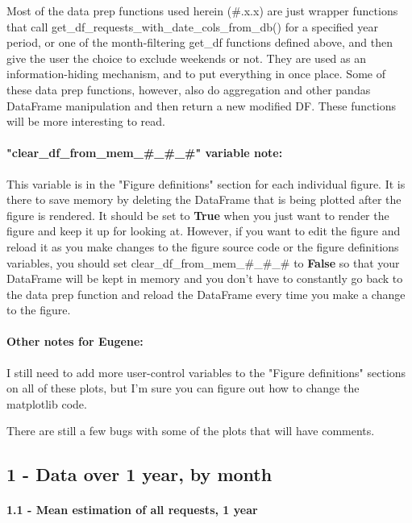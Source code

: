 \documentclass[11pt]{article}
\begin{document}
Most of the data prep functions used herein (\#.x.x) are just wrapper
functions that call get\_df\_requests\_with\_date\_cols\_from\_db() for
a specified year period, or one of the month-filtering get\_df functions
defined above, and then give the user the choice to exclude weekends or
not. They are used as an information-hiding mechanism, and to put
everything in once place. Some of these data prep functions, however,
also do aggregation and other pandas DataFrame manipulation and then
return a new modified DF. These functions will be more interesting to
read.

\paragraph{"clear\_df\_from\_mem\_\#\_\#\_\#" variable
note:}\label{clear_df_from_mem___-variable-note}

This variable is in the "Figure definitions" section for each individual
figure. It is there to save memory by deleting the DataFrame that is
being plotted after the figure is rendered. It should be set to
\textbf{True} when you just want to render the figure and keep it up for
looking at. However, if you want to edit the figure and reload it as you
make changes to the figure source code or the figure definitions
variables, you should set clear\_df\_from\_mem\_\#\_\#\_\# to
\textbf{False} so that your DataFrame will be kept in memory and you
don't have to constantly go back to the data prep function and reload
the DataFrame every time you make a change to the figure.

    \paragraph{Other notes for Eugene:}\label{other-notes-for-eugene}

I still need to add more user-control variables to the "Figure
definitions" sections on all of these plots, but I'm sure you can figure
out how to change the matplotlib code.

There are still a few bugs with some of the plots that will have
comments.

    \subsection{1 - Data over 1 year, by
month}\label{data-over-1-year-by-month}

    \paragraph{1.1 - Mean estimation of all requests, 1
year}\label{mean-estimation-of-all-requests-1-year}
\end{document}
